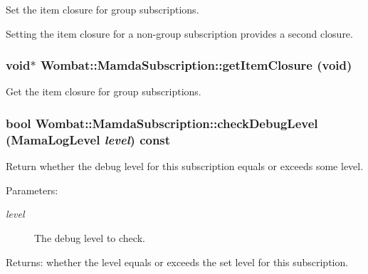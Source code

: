 Set the item closure for group subscriptions. 

Setting the item closure for a non-group subscription provides a second closure. \hypertarget{classWombat_1_1MamdaSubscription_b4359bc7b96f715697fd690e535a4273}{
\subsubsection[getItemClosure]{\setlength{\rightskip}{0pt plus 5cm}void$\ast$ Wombat::Mamda\-Subscription::get\-Item\-Closure (void)}}
\label{classWombat_1_1MamdaSubscription_b4359bc7b96f715697fd690e535a4273}


Get the item closure for group subscriptions. 

\hypertarget{classWombat_1_1MamdaSubscription_8e21b5cae69bba048335e3e19802543f}{
\subsubsection[checkDebugLevel]{\setlength{\rightskip}{0pt plus 5cm}bool Wombat::Mamda\-Subscription::check\-Debug\-Level (Mama\-Log\-Level {\em level}) const}}
\label{classWombat_1_1MamdaSubscription_8e21b5cae69bba048335e3e19802543f}


Return whether the debug level for this subscription equals or exceeds some level. 

\begin{Desc}
\item[Parameters:]
\begin{description}
\item[{\em level}]The debug level to check. \end{description}
\end{Desc}
\begin{Desc}
\item[Returns:]whether the level equals or exceeds the set level for this subscription. \end{Desc}
